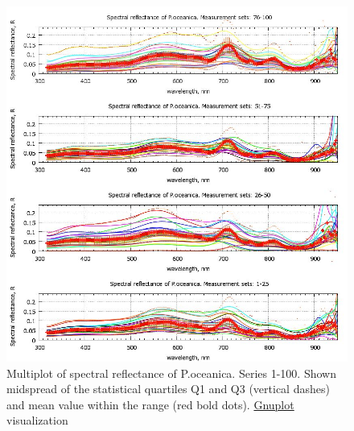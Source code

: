 \documentclass[10pt, a4paper]{article}
\begin{document}
\begin{figure}
	\begin{center}
		\includegraphics[scale=0.45]{GNU-13.jpg}
		\caption{Multiplot of spectral reflectance of P.oceanica. Series 1-100. Shown midspread of the statistical quartiles Q1 and Q3 (vertical dashes) and
			mean value within the range (red bold dots). \href{http://www.gnuplot.info/}{Gnuplot} visualization­}
		\label{fig:35}
	\end{center}
\end{figure}
\end{document}
